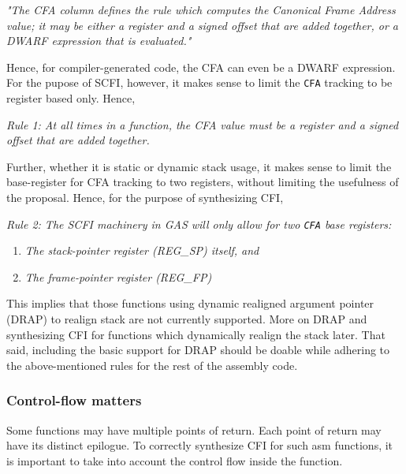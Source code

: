 \documentclass{article} \usepackage[a4paper, total={6in, 8in}]{geometry}
\begin{document}
\emph{"The CFA column defines the rule which computes the Canonical Frame Address
value; it may be either a register and a signed offset that are added together, or a
DWARF expression that is evaluated."}

Hence, for compiler-generated code, the CFA can even be a DWARF expression. For
the pupose of SCFI, however, it makes sense to limit the \texttt{CFA} tracking to be
register based only.  Hence,

\begin{center}

\emph{Rule 1: At all times in a function, the CFA value must be a register and a signed
offset that are added together.}

\end{center}

Further, whether it is static or dynamic stack usage, it makes sense to limit
the base-register for CFA tracking to two registers, without limiting the
usefulness of the proposal.  Hence, for the purpose of synthesizing CFI,

\begin{center}
\emph{Rule 2: The SCFI machinery in GAS will only allow for two \texttt{CFA} base registers:}

\begin{enumerate}
\item \emph{The stack-pointer register (REG\_SP) itself, and}
\item \emph{The frame-pointer register (REG\_FP)}
\end{enumerate}

\end{center}

This implies that those functions using dynamic realigned argument pointer
(DRAP) to realign stack are not currently supported.  More on DRAP and
synthesizing CFI for functions which dynamically realign the stack later.
That said, including the basic support for DRAP should be doable while adhering
to the above-mentioned rules for the rest of the assembly code.

\subsubsection{Control-flow matters}
\label{sectioncfmatters}
Some functions may have multiple points of return.  Each point of return may
have its distinct epilogue.  To correctly synthesize CFI for such asm
functions, it is important to take into account the control flow inside the
function.
\end{document}
